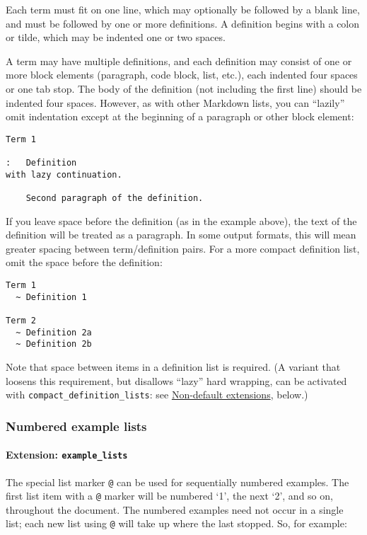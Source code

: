 \documentclass[
]{article}
\begin{document}
Each term must fit on one line, which may optionally be followed by a
blank line, and must be followed by one or more definitions. A
definition begins with a colon or tilde, which may be indented one or
two spaces.

A term may have multiple definitions, and each definition may consist of
one or more block elements (paragraph, code block, list, etc.), each
indented four spaces or one tab stop. The body of the definition (not
including the first line) should be indented four spaces. However, as
with other Markdown lists, you can ``lazily'' omit indentation except at
the beginning of a paragraph or other block element:

\begin{verbatim}
Term 1

:   Definition
with lazy continuation.

    Second paragraph of the definition.
\end{verbatim}

If you leave space before the definition (as in the example above), the
text of the definition will be treated as a paragraph. In some output
formats, this will mean greater spacing between term/definition pairs.
For a more compact definition list, omit the space before the
definition:

\begin{verbatim}
Term 1
  ~ Definition 1

Term 2
  ~ Definition 2a
  ~ Definition 2b
\end{verbatim}

Note that space between items in a definition list is required. (A
variant that loosens this requirement, but disallows ``lazy'' hard
wrapping, can be activated with \texttt{compact\_definition\_lists}: see
\hyperref[non-default-extensions]{Non-default extensions}, below.)

\subsubsection{Numbered example lists}\label{numbered-example-lists}

\paragraph{\texorpdfstring{Extension:
\texttt{example\_lists}}{Extension: example\_lists}}\label{extension-example_lists}

The special list marker \texttt{@} can be used for sequentially numbered
examples. The first list item with a \texttt{@} marker will be numbered
`1', the next `2', and so on, throughout the document. The numbered
examples need not occur in a single list; each new list using \texttt{@}
will take up where the last stopped. So, for example:
\end{document}
